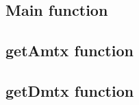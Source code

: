 \subsection*{Main function}
{\footnotesize }
\subsection*{getAmtx function}
{\footnotesize }
\subsection*{getDmtx function}
{\footnotesize }